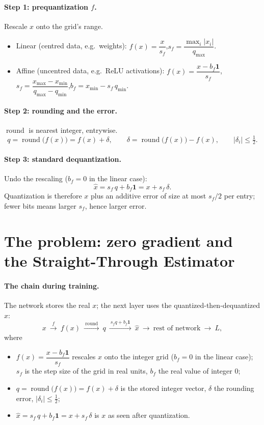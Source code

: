 \documentclass[11pt]{article}
\begin{document}
\paragraph{Step 1: prequantization $f$.} Rescale $x$ onto the grid's range.
\begin{itemize}
\item Linear (centred data, e.g.\ weights): $f(x)=\dfrac{x}{s_f}$,\quad $s_f=\dfrac{\max_i|x_i|}{q_{\max}}$.
\item Affine (uncentred data, e.g.\ ReLU activations): $f(x)=\dfrac{x-b_f\mathbf 1}{s_f}$,\quad $s_f=\dfrac{x_{\max}-x_{\min}}{q_{\max}-q_{\min}}$,\quad $b_f=x_{\min}-s_f\,q_{\min}$.
\end{itemize}

\paragraph{Step 2: rounding and the error.} $\operatorname{round}$ is nearest integer, entrywise.
\[
q=\operatorname{round}\big(f(x)\big)=f(x)+\delta,\qquad \delta=\operatorname{round}\big(f(x)\big)-f(x),\qquad |\delta_i|\le\tfrac12 .
\]

\paragraph{Step 3: standard dequantization.} Undo the rescaling ($b_f=0$ in the linear case):
\[
\hat x=s_f\,q+b_f\mathbf 1=x+s_f\,\delta .
\]
Quantization is therefore $x$ plus an additive error of size at most $s_f/2$ per entry; fewer bits means larger $s_f$, hence larger error.

\section{The problem: zero gradient and the Straight-Through Estimator}

\paragraph{The chain during training.} The network stores the real $x$; the next layer uses the quantized-then-dequantized $\hat x$:
\[
x\ \xrightarrow{\ f\ }\ f(x)\ \xrightarrow{\ \operatorname{round}\ }\ q\ \xrightarrow{\ s_f q+b_f\mathbf 1\ }\ \hat x\ \longrightarrow\ \text{rest of network}\ \longrightarrow\ L,
\]
where
\begin{itemize}
\item $f(x)=\dfrac{x-b_f\mathbf 1}{s_f}$ rescales $x$ onto the integer grid ($b_f=0$ in the linear case); $s_f$ is the step size of the grid in real units, $b_f$ the real value of integer $0$;
\item $q=\operatorname{round}\big(f(x)\big)=f(x)+\delta$ is the stored integer vector, $\delta$ the rounding error, $|\delta_i|\le\frac12$;
\item $\hat x=s_f\,q+b_f\mathbf 1=x+s_f\,\delta$ is $x$ as seen after quantization.
\end{itemize}
\end{document}
